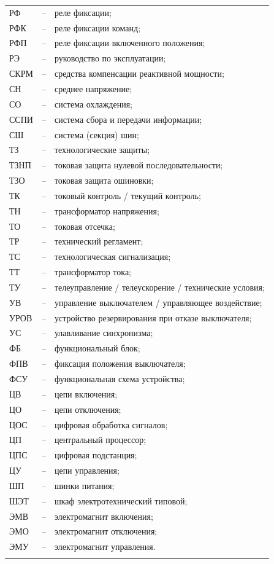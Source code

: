 \begin{longtable}{>{\raggedright\arraybackslash}m{2cm}>{\raggedright\arraybackslash}m{0.5cm}>{\raggedright\arraybackslash}m{20cm}}
РФ & -- & реле фиксации; \\
РФК & -- & реле фиксации команд; \\
РФП & -- & реле фиксации включенного положения; \\
РЭ & -- & руководство по эксплуатации; \\
СКРМ & -- & средства компенсации реактивной мощности; \\
СН & -- & среднее напряжение; \\
СО & -- & система охлаждения; \\
ССПИ & -- & система сбора и передачи информации; \\
СШ & -- & система (секция) шин; \\
ТЗ & -- & технологические защиты; \\
ТЗНП & -- & токовая защита нулевой последовательности; \\
ТЗО & -- & токовая защита ошиновки; \\
ТК & -- & токовый контроль / текущий контроль; \\
ТН & -- & трансформатор напряжения; \\
ТО & -- & токовая отсечка; \\
ТР & -- & технический регламент; \\
ТС & -- & технологическая сигнализация; \\
ТТ & -- & трансформатор тока; \\
ТУ & -- & телеуправление / телеускорение / технические условия; \\
УВ & -- & управление выключателем / управляющее воздействие; \\
УРОВ & -- & устройство резервирования при отказе выключателя; \\
УС & -- & улавливание синхронизма; \\
ФБ & -- & функциональный блок; \\
ФПВ & -- & фиксация положения выключателя; \\
ФСУ & -- & функциональная схема устройства; \\
ЦВ & -- & цепи включения; \\
ЦО & -- & цепи отключения; \\
ЦОС & -- & цифровая обработка сигналов; \\
ЦП & -- & центральный процессор; \\
ЦПС & -- & цифровая подстанция; \\
ЦУ & -- & цепи управления; \\
ШП & -- & шинки питания; \\
ШЭТ & -- & шкаф электротехнический типовой; \\
ЭМВ & -- & электромагнит включения; \\
ЭМО & -- & электромагнит отключения; \\
ЭМУ & -- & электромагнит управления. \\
{\color{white}\fontsize{0.1pt}{0.1pt}\selectfont<endABBRS>}
\end{longtable}
